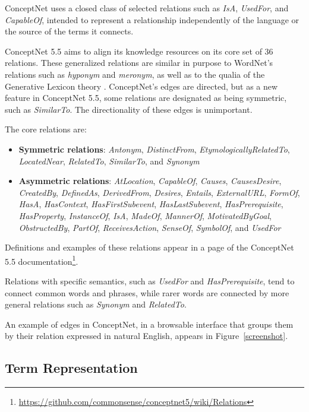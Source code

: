 \documentclass[letterpaper]{article}
\begin{document}
ConceptNet uses a closed class of selected relations such as \emph{IsA},
\emph{UsedFor}, and \emph{CapableOf}, intended to
represent a relationship independently of the language or the source of
the terms it connects.

ConceptNet 5.5 aims to align its knowledge resources on its core set of 36
relations. These generalized relations are similar in purpose to WordNet's
relations such as \emph{hyponym} and \emph{meronym}, as well as to the qualia
of the Generative Lexicon theory \cite{pustejovsky1991generative}.
ConceptNet's edges are directed, but as a new feature in ConceptNet 5.5,
some relations are designated as being symmetric, such as \emph{SimilarTo}.
The directionality of these edges is unimportant.

The core relations are:
\begin{itemize}
    \item {\bf Symmetric relations}: \emph{Antonym}, \emph{DistinctFrom},
        \emph{EtymologicallyRelatedTo}, \emph{LocatedNear},
        \emph{RelatedTo}, \emph{SimilarTo}, and \emph{Synonym}
    \item {\bf Asymmetric relations}: \emph{AtLocation}, \emph{CapableOf},
        \emph{Causes}, \emph{CausesDesire}, \emph{CreatedBy},
        \emph{DefinedAs}, \emph{DerivedFrom}, \emph{Desires},
        \emph{Entails}, \emph{ExternalURL},
        \emph{FormOf}, \emph{HasA}, \emph{HasContext},
        \emph{HasFirstSubevent}, \emph{HasLastSubevent},
        \emph{HasPrerequisite}, \emph{HasProperty}, \emph{InstanceOf},
        \emph{IsA}, \emph{MadeOf}, \emph{MannerOf}, \emph{MotivatedByGoal},
        \emph{ObstructedBy}, \emph{PartOf}, \emph{ReceivesAction},
        \emph{SenseOf}, \emph{SymbolOf}, and \emph{UsedFor}
\end{itemize}

Definitions and examples of these relations appear in a page of the ConceptNet 5.5
documentation\footnote{\url{https://github.com/commonsense/conceptnet5/wiki/Relations}}.

Relations with specific semantics, such as \emph{UsedFor} and
\emph{HasPrerequisite}, tend to connect common words and phrases, while
rarer words are connected by more general relations such as
\emph{Synonym} and \emph{RelatedTo}.

An example of edges in ConceptNet, in a browsable interface that groups them by
their relation expressed in natural English, appears in
Figure~\ref{screenshot}.

\subsection{Term Representation}\label{term-representation}
\end{document}
